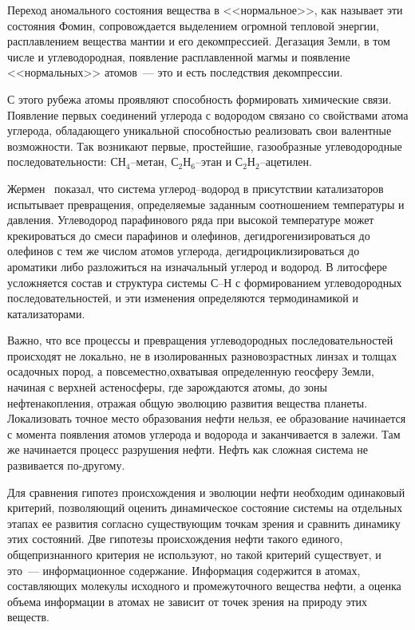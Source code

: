 \begin{multicols}{2}
     Переход аномального состояния вещества в <<нормальное>>, как называет 
эти состояния Фомин, сопровождается выделением огромной тепловой 
энергии, расплавлением вещества мантии и его декомпрессией. Дегазация Земли, в 
том числе и углеводородная, появление рас\-плав\-лен\-ной магмы и появление 
<<нормальных>> атомов~--- это и есть последствия декомпрессии. 
     
     С этого рубежа атомы проявляют способность формировать химические 
связи. Появление первых соединений углерода с водородом связано со свойствами 
атома углерода, обладающего уникальной способностью реализовать свои 
валентные возможности. Так возникают первые, простейшие, газообразные 
углеводородные последовательности: СН$_4$--метан, С$_2$Н$_6$--этан и 
С$_2$Н$_2$--ацетилен. 
     
Жермен~\cite{33s} показал, что система углерод--во\-до\-род в присутствии 
катализаторов испытывает превращения, определяемые заданным соотношением 
температуры и давления. Углеводород парафинового ряда при высокой 
температуре может крекироваться до смеси парафинов и олефинов, 
дегидрогенизироваться до олефинов с тем же чис\-лом атомов углерода, 
дегидроциклизироваться до ароматики либо разложиться на изначальный углерод 
и водород. В литосфере усложняется состав и структура системы С--Н с 
формированием углеводородных последовательностей, и эти изменения 
определяются термодинамикой и катализаторами. 
     
     Важно, что все процессы и превращения углеводородных 
последовательностей происходят не локально, не в изолированных 
разновозрастных линзах и толщах осадочных пород, а повсеместно,\linebreak охватывая 
определенную геосферу Земли, начиная с верхней астеносферы, где зарождаются 
атомы, до зоны нефтенакопления, отражая общую эволюцию развития вещества 
планеты. Локализовать точное место образования нефти нельзя, ее образование 
начинается с момента появления атомов углерода и водорода и заканчивается в 
залежи. Там же начинается процесс разрушения нефти. Нефть как сложная система 
не развивается по-другому.
     
     Для сравнения гипотез происхождения и эволюции нефти необходим 
одинаковый критерий, позволяющий оценить динамическое состояние сис\-те\-мы на 
отдельных этапах ее развития согласно существующим точкам зрения и сравнить 
динамику этих состояний. Две гипотезы происхождения нефти такого единого, 
общепризнанного критерия не используют, но такой критерий существует, и 
     это~--- информационное содержание. Информация содержится в атомах, 
составляющих молекулы исходного и промежуточного вещества нефти, а оценка 
объема информации в атомах не зависит от точек зрения на природу этих веществ.
     

\end{multicols}
